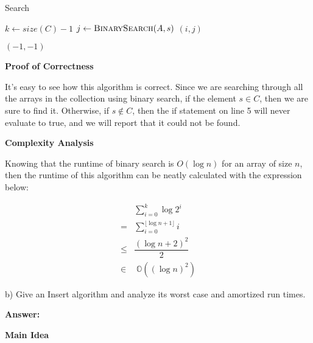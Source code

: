 \documentclass{article}
\newcommand\floor[1]{\lfloor#1\rfloor}
\begin{document}
\begin{algorithm}
    \caption{Search}\label{euclid}

    \begin{algorithmic}[1]
        \State $k \gets size(C) - 1$  
            \State $j \gets \Call{BinarySearch}{A, s}$
             \Return $(i, j)$
            \EndIf
        \EndFor

        \State \Return $(-1, -1)$
        \EndProcedure
    \end{algorithmic}
\end{algorithm}

\newline

\textbf{Proof of Correctness}

It's easy to see how this algorithm is correct. Since we are searching through all the arrays in the collection
using binary search, if the element $s \in C$, then we are sure to find it.
Otherwise, if $s \notin C$, then the if statement on line 5 will never evaluate to true, and we will report
that it could not be found.
\newline

\textbf{Complexity Analysis}

Knowing that the runtime of binary search is $O(\log n)$ for an array of size $n$,
then the runtime of this algorithm can be neatly calculated with the expression below:

\begin{align*}
    &\sum\limits_{i=0}^k \log{2^i} \\
    =& \sum\limits_{i=0}^{ \floor{\log n + 1} } i \\
    \leq& \dfrac{(\log{n} + 2)^2}{2} \\
    \in& \; \mathbb{O}((\log n)^2)
\end{align*}


\newline



b) Give an Insert algorithm and analyze its worst case and amortized run times.
\newline

\textbf{Answer:} \newline

\textbf{Main Idea}
\end{document}
